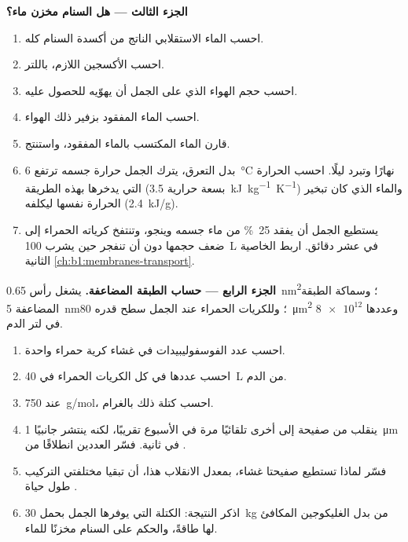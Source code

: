 \begin{problem}
\medskip
\noindent\textbf{الجزء الثالث --- هل السنام مخزن ماء؟}
\begin{enumerate}[resume]
  \item احسب الماء الاستقلابي الناتج من أكسدة السنام كله.
  \item احسب الأكسجين اللازم، باللتر.
  \item احسب حجم الهواء الذي على الجمل أن يهوّيه للحصول عليه.
  \item احسب الماء المفقود بزفير ذلك الهواء.
  \item قارن الماء المكتسب بالماء المفقود، واستنتج.
  \item بدل التعرق، يترك الجمل حرارة جسمه ترتفع \qty{6}{\celsius}
        نهارًا وتبرد ليلًا. احسب الحرارة التي يدخرها بهذه الطريقة
        (بسعة حرارية \qty{3.5}{kJ.kg^{-1}.K^{-1}}) والماء الذي كان
        تبخير الحرارة نفسها ليكلفه (\qty{2.4}{kJ/g}).
  \item يستطيع الجمل أن يفقد \qty{25}{\%} من ماء جسمه وينجو، وتنتفخ
        كرياته الحمراء إلى ضعف حجمها دون أن تنفجر حين يشرب
        \qty{100}{L} في عشر دقائق. اربط الخاصية الثانية 
        \cref{ch:b1:membranes-transport}.
\end{enumerate}

\medskip
\noindent\textbf{الجزء الرابع --- حساب الطبقة المضاعفة.}
يشغل رأس  \qty{0.65}{nm^2}؛ وسماكة الطبقة المضاعفة
\qty{5}{nm}؛ وللكريات الحمراء عند الجمل سطح قدره
\qty{80}{\micro m^2} وعددها $\num{8e12}$ في لتر الدم.
\begin{enumerate}[resume]
  \item احسب عدد الفوسفوليبيدات في غشاء كرية حمراء واحدة.
  \item احسب عددها في كل الكريات الحمراء في \qty{40}{L} من الدم.
  \item عند \qty{750}{g/mol}، احسب كتلة ذلك  بالغرام.
  \item ينقلب  من صفيحة إلى أخرى تلقائيًا مرة في الأسبوع
        تقريبًا، لكنه ينتشر جانبيًا \qty{1}{\micro m} في ثانية.
        فسّر العددين انطلاقًا من .
  \item فسّر لماذا تستطيع صفيحتا غشاء، بمعدل الانقلاب هذا، أن تبقيا
        مختلفتي التركيب طول حياة .
  \item اذكر النتيجة: الكتلة التي يوفرها الجمل بحمل \qty{30}{kg} من
         بدل الغليكوجين المكافئ لها طاقةً، والحكم على السنام
        مخزنًا للماء.
\end{enumerate}
\end{problem}
